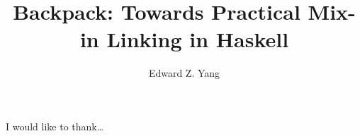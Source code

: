 \documentclass{report}
\begin{document}
\title{Backpack: Towards Practical Mix-in Linking in Haskell}
\author{Edward Z. Yang}

\beforepreface%
    I would like to thank\ldots
\afterpreface%
















\end{document}
